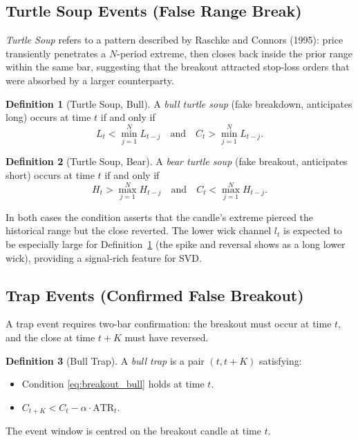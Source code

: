 \documentclass[11pt,a4paper]{article}
\theoremstyle{definition}
\newtheorem{definition}{Definition}[section]
\theoremstyle{plain}
\begin{document}
\subsection{Turtle Soup Events (False Range Break)}

\emph{Turtle Soup} refers to a pattern described by Raschke and Connors (1995): price
transiently penetrates a $N$-period extreme, then closes back inside the prior range
within the same bar, suggesting that the breakout attracted stop-loss orders that were
absorbed by a larger counterparty.

\begin{definition}[Turtle Soup, Bull]
\label{def:ts_bull}
A \emph{bull turtle soup} (fake breakdown, anticipates long) occurs at time $t$ if and
only if
\begin{equation}
    L_t < \min_{j=1}^{N} L_{t-j}
    \quad \text{and} \quad
    C_t > \min_{j=1}^{N} L_{t-j}.
    \label{eq:ts_bull}
\end{equation}
\end{definition}

\begin{definition}[Turtle Soup, Bear]
\label{def:ts_bear}
A \emph{bear turtle soup} (fake breakout, anticipates short) occurs at time $t$ if and
only if
\begin{equation}
    H_t > \max_{j=1}^{N} H_{t-j}
    \quad \text{and} \quad
    C_t < \max_{j=1}^{N} H_{t-j}.
    \label{eq:ts_bear}
\end{equation}
\end{definition}

In both cases the condition asserts that the candle's extreme pierced the historical
range but the close reverted. The lower wick channel $l_t$ is expected to be especially
large for Definition~\ref{def:ts_bull} (the spike and reversal shows as a long lower
wick), providing a signal-rich feature for SVD.

\subsection{Trap Events (Confirmed False Breakout)}

A trap event requires two-bar confirmation: the breakout must occur at time $t$, and
the close at time $t + K$ must have reversed.

\begin{definition}[Bull Trap]
\label{def:bull_trap}
A \emph{bull trap} is a pair $(t, t+K)$ satisfying:
\begin{itemize}
    \item[(i)] Condition \eqref{eq:breakout_bull} holds at time $t$.
    \item[(ii)] $C_{t+K} < C_t - \alpha \cdot \mathrm{ATR}_t$.
\end{itemize}
The event window is centred on the breakout candle at time $t$.
\end{definition}
\end{document}

